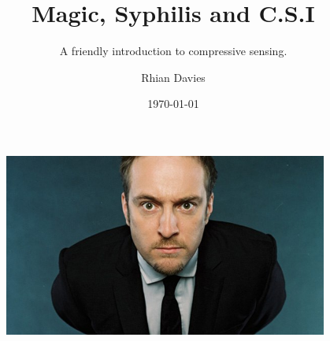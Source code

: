 \documentclass{beamer}
\begin{document}
\title{Magic, Syphilis and C.S.I}
\subtitle{A friendly introduction to compressive sensing.}
\author{Rhian Davies}
\date{\today}

\begin{frame}[plain] 
  \titlepage
\end{frame}
%

\begin{frame}
  \begin{figure}[h]
    \centering
\includegraphics[height = 6cm]{derrenbrown.jpg}    
  \end{figure}
\end{frame}
\end{document}
